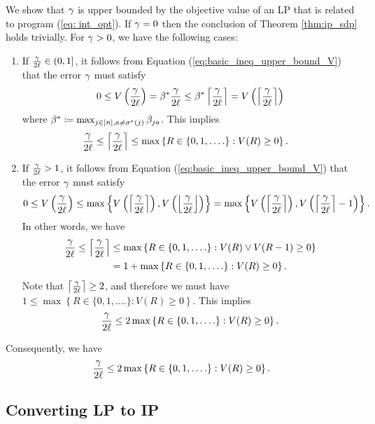 We show that $\gamma$ is upper bounded by the objective value of
an LP that is related to program (\ref{eq: int_opt}). If $\gamma=0$
then the conclusion of Theorem \ref{thm:ip_sdp} holds trivially.
For $\gamma>0$, we have the following cases:
\begin{enumerate}
\item If $\frac{\gamma}{2\ell}\in(0,1]$, it follows from Equation (\ref{eq:basic_ineq_upper_bound_V})
that the error $\gamma$ must satisfy 
\[
0\le V\left(\frac{\gamma}{2\ell}\right)=\beta^{*}\frac{\gamma}{2\ell}\le\beta^{*}\left\lceil \frac{\gamma}{2\ell}\right\rceil =V\left(\left\lceil \frac{\gamma}{2\ell}\right\rceil \right)
\]
where $\beta^{*}\coloneqq\max_{j\in\left[n\right],a\ne\sigma^{*}(j)}\beta_{ja}$.
This implies 
\begin{align*}
\frac{\gamma}{2\ell}\le\left\lceil \frac{\gamma}{2\ell}\right\rceil  & \le\max\left\{ R\in\{0,1,.\ldots\}:V(R)\ge0\right\} .
\end{align*}
\item If $\frac{\gamma}{2\ell}>1$, it follows from Equation (\ref{eq:basic_ineq_upper_bound_V})
that the error $\gamma$ must satisfy 
\[
0\le V\left(\frac{\gamma}{2\ell}\right)\le\max\left\{ V\left(\left\lceil \frac{\gamma}{2\ell}\right\rceil \right),V\left(\left\lfloor \frac{\gamma}{2\ell}\right\rfloor \right)\right\} =\max\left\{ V\left(\left\lceil \frac{\gamma}{2\ell}\right\rceil \right),V\left(\left\lceil \frac{\gamma}{2\ell}\right\rceil -1\right)\right\} .
\]
In other words, we have
\begin{align*}
\frac{\gamma}{2\ell}\le\left\lceil \frac{\gamma}{2\ell}\right\rceil  & \le\max\left\{ R\in\{0,1,.\ldots\}:V(R)\vee V(R-1)\ge0\right\} \\
 & =1+\max\left\{ R\in\{0,1,.\ldots\}:V(R)\ge0\right\} .
\end{align*}
Note that $\left\lceil \frac{\gamma}{2\ell}\right\rceil \ge2$, and
therefore we must have $1\le\max\left\{ R\in\{0,1,.\ldots\}:V(R)\ge0\right\} $.
This implies 
\[
\frac{\gamma}{2\ell}\le2\max\left\{ R\in\{0,1,.\ldots\}:V(R)\ge0\right\} .
\]
\end{enumerate}
Consequently, we have 
\[
\frac{\gamma}{2\ell}\le2\max\left\{ R\in\{0,1,.\ldots\}:V(R)\ge0\right\} .
\]


\subsection{Converting LP to IP}

